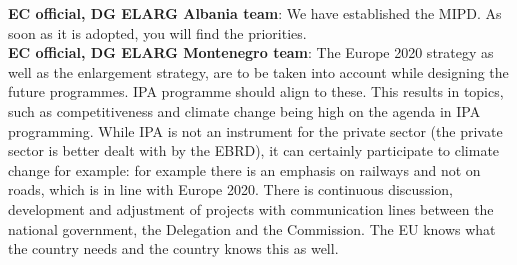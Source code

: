 \textbf{EC official, DG ELARG Albania team}: We have established the MIPD. As soon as it is adopted, you will find the priorities. \\
\textbf{EC official, DG ELARG Montenegro team}: The Europe 2020 strategy as well as  the enlargement strategy, are to be taken into account while designing the future programmes. IPA programme should align to these.  This results in topics, such as competitiveness and climate change being high on the agenda in IPA programming. While IPA is not an instrument for the private sector (the private sector is better dealt with by the EBRD), it can certainly participate to climate change for example: for example there is an emphasis on railways and not on roads, which is in line with Europe 2020. There is continuous discussion, development and adjustment of projects with communication lines between the national government, the Delegation and the Commission. The EU knows what the country needs and the country knows this as well. \\
